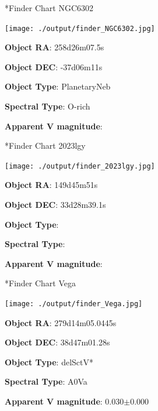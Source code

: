 \documentclass[12pt,preprintnumbers,amsmath,amssymb,nofootinbib,superscriptaddress]{revtex4-1}
\begin{document}
\newpage

*{Finder Chart NGC6302}\label{Ueff}

\begin{minipage}{0.6\textwidth}
    \texttt{[image: ./output/finder\_NGC6302.jpg]}
\vspace{-2cm}

\end{minipage}
\begin{minipage}{0.3\textwidth}

\textbf{Object RA}: 258d26m07.5s

\textbf{Object DEC}: -37d06m11s

\textbf{Object Type}: PlanetaryNeb

\textbf{Spectral Type}: O-rich

\textbf{Apparent V magnitude}:  

\end{minipage}

\newpage

*{Finder Chart 2023lgy}\label{Ueff}

\begin{minipage}{0.6\textwidth}
    \texttt{[image: ./output/finder\_2023lgy.jpg]}
\vspace{-2cm}

\end{minipage}
\begin{minipage}{0.3\textwidth}

\textbf{Object RA}: 149d45m51s

\textbf{Object DEC}: 33d28m39.1s

\textbf{Object Type}:  

\textbf{Spectral Type}:  

\textbf{Apparent V magnitude}:  

\end{minipage}

\newpage

*{Finder Chart Vega}\label{Ueff}

\begin{minipage}{0.6\textwidth}
    \texttt{[image: ./output/finder\_Vega.jpg]}
\vspace{-2cm}

\end{minipage}
\begin{minipage}{0.3\textwidth}

\textbf{Object RA}: 279d14m05.0445s

\textbf{Object DEC}: 38d47m01.28s

\textbf{Object Type}: delSctV*

\textbf{Spectral Type}: A0Va

\textbf{Apparent V magnitude}: 0.030$\pm$0.000

\end{minipage}
\end{document}
